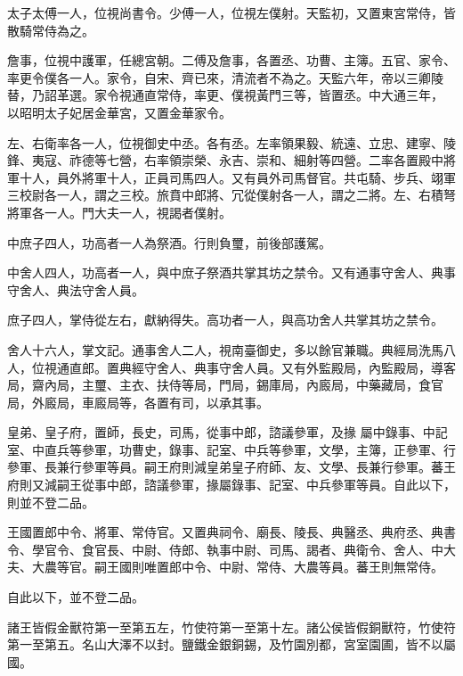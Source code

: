 \begin{pinyinscope}
 太子太傅一人，位視尚書令。少傅一人，位視左僕射。天監初，又置東宮常侍，皆散騎常侍為之。



 詹事，位視中護軍，任總宮朝。二傅及詹事，各置丞、功曹、主簿。五官、家令、率更令僕各一人。家令，自宋、齊已來，清流者不為之。天監六年，帝以三卿陵替，乃詔革選。家令視通直常侍，率更、僕視黃門三等，皆置丞。中大通三年，
 以昭明太子妃居金華宮，又置金華家令。



 左、右衛率各一人，位視御史中丞。各有丞。左率領果毅、統遠、立忠、建寧、陵鋒、夷寇、祚德等七營，右率領崇榮、永吉、崇和、細射等四營。二率各置殿中將軍十人，員外將軍十人，正員司馬四人。又有員外司馬督官。共屯騎、步兵、翊軍三校尉各一人，謂之三校。旅賁中郎將、冗從僕射各一人，謂之二將。左、右積弩將軍各一人。門大夫一人，視謁者僕射。



 中庶子四人，功高者一人為祭酒。行則負璽，前後部護駕。



 中舍人四人，功高者一人，與中庶子祭酒共掌其坊之禁令。又有通事守舍人、典事守舍人、典法守舍人員。



 庶子四人，掌侍從左右，獻納得失。高功者一人，與高功舍人共掌其坊之禁令。



 舍人十六人，掌文記。通事舍人二人，視南臺御史，多以餘官兼職。典經局洗馬八人，位視通直郎。置典經守舍人、典事守舍人員。又有外監殿局，內監殿局，導客局，齋內局，主璽、主衣、扶侍等局，門局，錫庫局，內廄局，中藥藏局，食官局，外廄局，車廄局等，各置有司，以承其事。



 皇弟、皇子府，置師，長史，司馬，從事中郎，諮議參軍，及掾
 屬中錄事、中記室、中直兵等參軍，功曹史，錄事、記室、中兵等參軍，文學，主簿，正參軍、行參軍、長兼行參軍等員。嗣王府則減皇弟皇子府師、友、文學、長兼行參軍。蕃王府則又減嗣王從事中郎，諮議參軍，掾屬錄事、記室、中兵參軍等員。自此以下，則並不登二品。



 王國置郎中令、將軍、常侍官。又置典祠令、廟長、陵長、典醫丞、典府丞、典書令、學官令、食官長、中尉、侍郎、執事中尉、司馬、謁者、典衛令、舍人、中大夫、大農等官。嗣王國則唯置郎中令、中尉、常侍、大農等員。蕃王則無常侍。



 自此以下，並不登二品。



 諸王皆假金獸符第一至第五左，竹使符第一至第十左。諸公侯皆假銅獸符，竹使符第一至第五。名山大澤不以封。鹽鐵金銀銅錫，及竹園別都，宮室園圃，皆不以屬國。




\end{pinyinscope}
